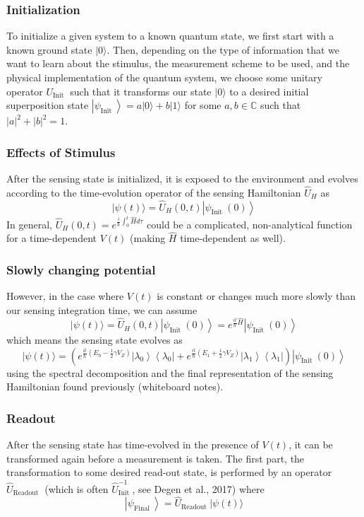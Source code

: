 \documentclass{beamer}
\begin{document}
\begin{frame}
\frametitle{Initialization}

To initialize a given system to a known quantum state, we first start
with a known ground state $|0\rangle$. Then, depending on the type of
information that we want to learn about the stimulus, the measurement
scheme to be used, and the physical implementation of the quantum
system, we choose some unitary operator $U_{\text {Init }}$ such that
it transforms our state $|0\rangle$ to a desired initial superposition
state $\left|\psi_{\text {Init }}\right\rangle=a|0\rangle+b|1\rangle$
for some $a, b \in \mathbb{C}$ such that $|a|^{2}+|b|^{2}=1$.
\end{frame}

\begin{frame}
\frametitle{Effects of Stimulus}

After the sensing state is initialized, it is exposed to the environment and evolves according to the time-evolution operator of the sensing Hamiltonian $\hat{U}_{H}$ as
\[
|\psi(t)\rangle=\hat{U}_{H}(0, t)\left|\psi_{\text {Init }}(0)\right\rangle
\]
In general, $\hat{U}_{H}(0, t)=e^{\frac{i}{\hbar} \int_{0}^{t} \hat{H} d \tau}$ could be a complicated, non-analytical function for a time-dependent $V(t)$ (making $\hat{H}$ time-dependent as well).
\end{frame}

\begin{frame}
\frametitle{Slowly changing potential}

However, in the case where $V(t)$ is constant or changes much more slowly than our sensing integration time, we can assume
\[
|\psi(t)\rangle=\hat{U}_{H}(0, t)\left|\psi_{\text {Init }}(0)\right\rangle=e^{\frac{i t}{\hbar} \hat{H}}\left|\psi_{\text {Init }}(0)\right\rangle
\]
which means the sensing state evolves as
\[
|\psi(t)\rangle=\left(e^{\frac{i t}{\hbar}\left(E_{0}-\frac{1}{2} \gamma V_Z\right)}\left|\lambda_{0}\right\rangle\left\langle\lambda_{0}\right|+e^{\frac{i t}{\hbar}\left(E_{1}+\frac{1}{2} \gamma V_Z\right)}\left|\lambda_{1}\right\rangle\left\langle\lambda_{1}\right|\right)\left|\psi_{\text {Init }}(0)\right\rangle
\]
using the spectral decomposition and the final representation of the
sensing Hamiltonian found previously (whiteboard notes).
\end{frame}

\begin{frame}
\frametitle{Readout}

After the sensing state has time-evolved in the presence of $V(t)$, it
can be transformed again before a measurement is taken. The first
part, the transformation to some desired read-out state, is performed
by an operator $\hat{U}_{\text {Readout }}$ (which is often
$\hat{U}_{\text {Init }}^{-1}$, see Degen et al., 2017) where
\[
\left|\psi_{\text {Final }}\right\rangle=\hat{U}_{\text {Readout }}|\psi(t)\rangle
\]
\end{frame}
\end{document}
